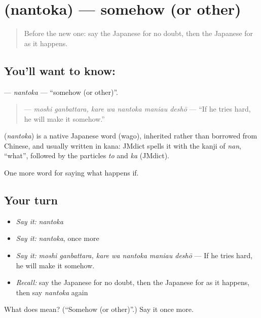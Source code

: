 \section[\texorpdfstring{\ja{なんとか} (nantoka)}{なんとか (nantoka)}]{ (nantoka) — somehow (or other)}

\label{lesson:JA-C523-nantoka}



\begin{quote}
Before the new one: say the Japanese for no doubt, then the Japanese for as it happens.
\end{quote}

\subsection*{You'll want to know: }
\textbf{} — \emph{nantoka} — \textquotedblleft{}somehow (or other)\textquotedblright{}.

\begin{quote}
\textbf{   } — \emph{moshi ganbattara, kare wa nantoka maniau deshō} — \textquotedblleft{}If he tries hard, he will make it somehow.\textquotedblright{}
\end{quote}

\begin{cousinweb}
\textbf{} (\emph{nantoka}) is a native Japanese word (wago), inherited rather than borrowed from Chinese, and usually written in kana: JMdict spells it with the kanji of \emph{nan}, \textquotedblleft{}what\textquotedblright{}, followed by the particles \emph{to} and \emph{ka} (JMdict).
\end{cousinweb}

\begin{grammarlens}[title={What you've built}]
One more word for saying what happens if.
\end{grammarlens}

\subsection*{Your turn}
\begin{itemize}
\raggedright
  \item \emph{Say it:} \emph{nantoka}
  \item \emph{Say it:} \emph{nantoka}, once more
  \item \emph{Say it:} \emph{moshi ganbattara, kare wa nantoka maniau deshō} — If he tries hard, he will make it somehow.
  \item \emph{Recall:} say the Japanese for no doubt, then the Japanese for as it happens, then say \emph{nantoka} again
\end{itemize}

\begin{tcolorbox}[breakable,colback=teal!4,colframe=teal!35!black,title={Before you move on}]
What does  mean? (\textquotedblleft{}Somehow (or other)\textquotedblright{}.) Say it once more.
\end{tcolorbox}
